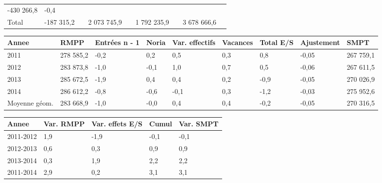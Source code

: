 \begin{longtable}[]{@{}lllllllll@{}}
\begin{minipage}[t]{0.10\columnwidth}
-430 266,8\strut
\end{minipage} & \begin{minipage}[t]{0.06\columnwidth}\raggedright
-0,4\strut
\end{minipage}\tabularnewline
\begin{minipage}[t]{0.05\columnwidth}\raggedright
Total\strut
\end{minipage} & \begin{minipage}[t]{0.10\columnwidth}\raggedright
-187 315,2\strut
\end{minipage} & \begin{minipage}[t]{0.06\columnwidth}\raggedright
\strut
\end{minipage} & \begin{minipage}[t]{0.16\columnwidth}\raggedright
2 073 745,9\strut
\end{minipage} & \begin{minipage}[t]{0.06\columnwidth}\raggedright
\strut
\end{minipage} & \begin{minipage}[t]{0.12\columnwidth}\raggedright
1 792 235,9\strut
\end{minipage} & \begin{minipage}[t]{0.06\columnwidth}\raggedright
\strut
\end{minipage} & \begin{minipage}[t]{0.10\columnwidth}\raggedright
3 678 666,6\strut
\end{minipage} & \begin{minipage}[t]{0.06\columnwidth}\raggedright
\strut
\end{minipage}\tabularnewline
\bottomrule
\end{longtable}

\begin{longtable}[]{@{}lllllllll@{}}
\toprule
Annee & RMPP & Entrées n - 1 & Noria & Var. effectifs & Vacances & Total
E/S & Ajustement & SMPT\tabularnewline
\midrule
\endhead
2011 & 278 585,2 & -0,2 & 0,2 & 0,5 & 0,3 & 0,8 & -0,05 & 267
759,1\tabularnewline
2012 & 283 873,8 & -1,0 & -0,1 & 1,0 & 0,7 & 0,5 & -0,06 & 267
611,5\tabularnewline
2013 & 285 672,5 & -1,9 & 0,4 & 0,4 & 0,2 & -0,9 & -0,05 & 270
026,9\tabularnewline
2014 & 286 612,2 & -0,8 & -0,6 & -0,1 & 0,3 & -1,2 & -0,03 & 275
952,6\tabularnewline
Moyenne géom. & 283 668,9 & -1,0 & -0,0 & 0,4 & 0,4 & -0,2 & -0,05 & 270
316,5\tabularnewline
\bottomrule
\end{longtable}

\begin{longtable}[]{@{}lllll@{}}
\toprule
Annee & Var. RMPP & Var. effets E/S & Cumul & Var. SMPT\tabularnewline
\midrule
\endhead
2011-2012 & 1,9 & -1,9 & -0,1 & -0,1\tabularnewline
2012-2013 & 0,6 & 0,3 & 0,9 & 0,9\tabularnewline
2013-2014 & 0,3 & 1,9 & 2,2 & 2,2\tabularnewline
2011-2014 & 2,9 & 0,2 & 3,1 & 3,1\tabularnewline
\bottomrule
\end{longtable}


